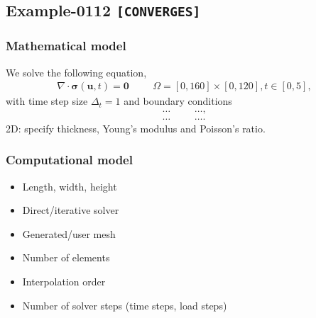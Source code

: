%
\clearpage
%
\subsection{Example-0112 \texttt{[CONVERGES]}}
%
%
\subsubsection{Mathematical model}
%
We solve the following equation,
%
\begin{align}
    \nabla \cdot \boldsymbol{\sigma} (\boldsymbol{u}, t) = \boldsymbol{0} & &&\Omega = [0, 160] \times [0, 120], t \in [0, 5],
\end{align}
%
with time step size $\Delta_t = 1$ and boundary conditions
%
\begin{align}
    \ldots & && \ldots, \\
    \ldots & && \ldots.
\end{align}
%
2D: specify thickness, Young's modulus and Poisson's ratio.
%
%
\subsubsection{Computational model}
%
\begin{itemize}
    \item{Length, width, height}
    \item{Direct/iterative solver}
    \item{Generated/user mesh}
    \item{Number of elements}
    \item{Interpolation order}
    \item{Number of solver steps (time steps, load steps)}
\end{itemize}
%
%
